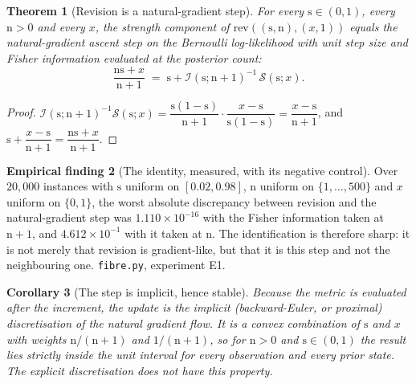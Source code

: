 \documentclass[11pt,a4paper]{article}
\theoremstyle{plain}
\newtheorem{theorem}{Theorem}[section]
\newtheorem{corollary}[theorem]{Corollary}
\theoremstyle{definition}
\newtheorem{finding}[theorem]{Empirical finding}
\theoremstyle{remark}
\newcommand{\str}{\mathrm{s}}
\newcommand{\ev}{\mathrm{n}}
\newcommand{\Fish}{\mathcal{I}}
\newcommand{\Score}{\mathcal{S}}
\begin{document}
\begin{theorem}[Revision is a natural-gradient step]\label{thm:natgrad}
For every $\str \in (0,1)$, every $\ev > 0$ and every $x$, the strength component
of $\mathrm{rev}((\str,\ev),(x,1))$ equals the natural-gradient ascent step on
the Bernoulli log-likelihood with unit step size and Fisher information evaluated
at the posterior count:
\[
\frac{\ev\str + x}{\ev+1}
\;=\;
\str + \Fish(\str;\ev+1)^{-1}\,\Score(\str;x).
\]
\end{theorem}

\begin{proof}
$\Fish(\str;\ev+1)^{-1}\Score(\str;x) = \dfrac{\str(1-\str)}{\ev+1}\cdot
\dfrac{x-\str}{\str(1-\str)} = \dfrac{x-\str}{\ev+1}$, and
$\str + \dfrac{x-\str}{\ev+1} = \dfrac{\ev\str + x}{\ev+1}$.
\end{proof}

\begin{finding}[The identity, measured, with its negative control]
\label{find:natgrad}
Over $20{,}000$ instances with $\str$ uniform on $[0.02,0.98]$, $\ev$ uniform on
$\{1,\dots,500\}$ and $x$ uniform on $\{0,1\}$, the worst absolute discrepancy
between revision and the natural-gradient step was $1.110\times10^{-16}$ with the
Fisher information taken at $\ev+1$, and $4.612\times10^{-1}$ with it taken at
$\ev$. The identification is therefore sharp: it is not merely that revision is
gradient-like, but that it is this step and not the neighbouring one.
\texttt{fibre.py}, experiment E1.
\end{finding}

\begin{corollary}[The step is implicit, hence stable]\label{cor:implicit}
Because the metric is evaluated after the increment, the update is the implicit
(backward-Euler, or proximal) discretisation of the natural gradient flow. It is
a convex combination of $\str$ and $x$ with weights $\ev/(\ev+1)$ and
$1/(\ev+1)$, so for $\ev > 0$ and $\str\in(0,1)$ the result lies strictly inside
the unit interval for every observation and every prior state. The explicit
discretisation does not have this property.
\end{corollary}
\end{document}
